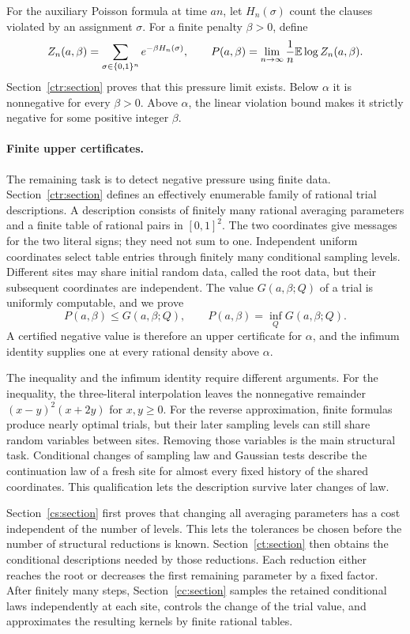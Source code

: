 For the auxiliary Poisson formula at time $an$, let $H_n(\sigma)$ count
the clauses violated by an assignment $\sigma$. For a finite penalty
$\beta>0$, define
\[
 Z_n(a,\beta)=\sum_{\sigma\in\{0,1\}^n}e^{-\beta H_n(\sigma)},
 \qquad
 P(a,\beta)=\lim_{n\to\infty}\frac1n\mathbb E\log Z_n(a,\beta).
\]
Section~\ref{ctr:section} proves that this pressure limit exists. Below
$\alpha$ it is nonnegative for every $\beta>0$. Above $\alpha$, the
linear violation bound makes it strictly negative for some positive
integer $\beta$.

\paragraph{Finite upper certificates.}
The remaining task is to detect negative pressure using finite data.
Section~\ref{ctr:section} defines an effectively enumerable family of
rational trial descriptions. A description consists of finitely many
rational averaging parameters and a finite table of rational pairs in
$[0,1]^2$. The two coordinates give messages for the two literal signs;
they need not sum to one. Independent uniform coordinates select table
entries through finitely many conditional sampling levels. Different
sites may share initial random data, called the root data, but their
subsequent coordinates are independent. The value $G(a,\beta;Q)$ of a
trial is uniformly computable, and we prove
\[
 P(a,\beta)\le G(a,\beta;Q),\qquad
 P(a,\beta)=\inf_Q G(a,\beta;Q).
\]
A certified negative value is therefore an upper certificate for
$\alpha$, and the infimum identity supplies one at every rational
density above $\alpha$.

The inequality and the infimum identity require different arguments.
For the inequality, the three-literal interpolation leaves the
nonnegative remainder $(x-y)^2(x+2y)$ for $x,y\ge0$. For the reverse
approximation, finite formulas produce nearly optimal trials, but their
later sampling levels can still share random variables between sites.
Removing those variables is the main structural task. Conditional
changes of sampling law and Gaussian tests describe the continuation
law of a fresh site for almost every fixed history of the shared
coordinates. This qualification lets the description survive later
changes of law.

Section~\ref{cs:section} first proves that changing all averaging
parameters has a cost independent of the number of levels. This lets
the tolerances be chosen before the number of structural reductions is
known. Section~\ref{ct:section} then obtains the conditional descriptions
needed by those reductions. Each reduction either reaches the root or
decreases the first remaining parameter by a fixed factor. After
finitely many steps, Section~\ref{cc:section} samples the retained
conditional laws independently at each site, controls the change of the
trial value, and approximates the resulting kernels by finite rational
tables.


